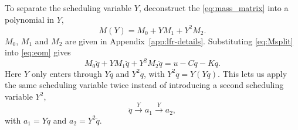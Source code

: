 To separate the scheduling variable $Y$, deconstruct 
the  \eqref{eq:mass_matrix} into a polynomial in $Y$,
\begin{equation}
  M(Y)=M_0+YM_1+Y^2M_2.
  \label{eq:Msplit}
\end{equation}
$M_0$, $M_1$ and $M_2$ are given in Appendix~\ref{app:lfr-details}.
Substituting \eqref{eq:Msplit} into \eqref{eq:eom} gives
\begin{equation}
  M_0\ddot q+YM_1\ddot q+Y^2M_2\ddot q=u-C\dot q-Kq.
  \label{eq:lfr_mass_factorization}
\end{equation}
Here $Y$ only enters through $Y\ddot q$ and $Y^2\ddot q$, 
with $Y^2\ddot q=Y(Y\ddot q)$. This lets us apply the same scheduling variable twice 
instead of introducing a second scheduling variable $Y^2$,
\begin{equation}
  \ddot q\xrightarrow{\;Y\;}a_1\xrightarrow{\;Y\;}a_2,
  \label{eq:lfr_chain}
\end{equation}
with $a_1=Y\ddot q$ and $a_2=Y^2\ddot q$.

